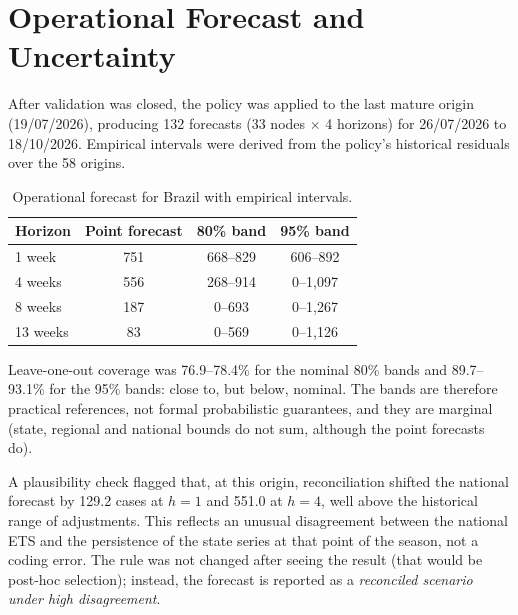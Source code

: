 \documentclass[12pt,a4paper]{article}
\begin{document}
\section{Operational Forecast and Uncertainty}\label{sec:op}

After validation was closed, the policy was applied to the last mature origin (19/07/2026), producing 132 forecasts (33 nodes $\times$ 4 horizons) for 26/07/2026 to 18/10/2026. Empirical intervals were derived from the policy's historical residuals over the 58 origins.

\begin{table}[H]
\centering\small
\caption{Operational forecast for Brazil with empirical intervals.}\label{tab:op}
\begin{tabular}{lccc}
\toprule
Horizon & Point forecast & 80\% band & 95\% band \\
\midrule
1 week & 751 & 668--829 & 606--892 \\
4 weeks & 556 & 268--914 & 0--1{,}097 \\
8 weeks & 187 & 0--693 & 0--1{,}267 \\
13 weeks & 83 & 0--569 & 0--1{,}126 \\
\bottomrule
\end{tabular}
\end{table}

Leave-one-out coverage was 76.9--78.4\% for the nominal 80\% bands and 89.7--93.1\% for the 95\% bands: close to, but below, nominal. The bands are therefore practical references, not formal probabilistic guarantees, and they are marginal (state, regional and national bounds do not sum, although the point forecasts do).

A plausibility check flagged that, at this origin, reconciliation shifted the national forecast by 129.2 cases at $h=1$ and 551.0 at $h=4$, well above the historical range of adjustments. This reflects an unusual disagreement between the national ETS and the persistence of the state series at that point of the season, not a coding error. The rule was not changed after seeing the result (that would be post-hoc selection); instead, the forecast is reported as a \emph{reconciled scenario under high disagreement}.

\end{document}
